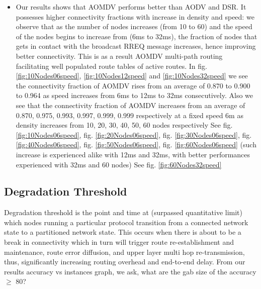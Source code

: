 \documentclass[letterpaper, 10 pt, conference]{ieeeconf}  %
\begin{document}
\begin{itemize}
  \item Our results shows that AOMDV performs better than AODV and DSR. It possesses higher connectivity fractions with increase in density and speed: we observe that as the number of nodes increases (from 10 to 60) and the speed of the nodes begins to increase from (6ms to 32ms), the fraction of nodes that gets in contact with the broadcast RREQ message increases, hence improving better connectivity. This is as a result AOMDV multi-path routing facilitating well populated route tables of active routes. In fig.  \ref{fig:10Nodes06speed}, \ref{fig:10Nodes12speed} and \ref{fig:10Nodes32speed} we see the connectivity fraction of AOMDV rises from an average of 0.870 to 0.900 to 0.964 as speed increases from 6ms to 12ms to 32ms consecutively. Also we see that the connectivity fraction of AOMDV increases from an average of 0.870, 0.975, 0.993, 0.997, 0.999, 0.999 respectively at a fixed speed 6m as density increases from 10, 20, 30, 40, 50, 60 nodes respectively See fig. \ref{fig:10Nodes06speed}, fig. \ref{fig:20Nodes06speed}, fig. \ref{fig:30Nodes06speed}, fig. \ref{fig:40Nodes06speed}, fig. \ref{fig:50Nodes06speed}, fig. \ref{fig:60Nodes06speed}  (such increase is experienced alike with 12ms and 32ms, with better performances experienced with 32ms and 60 nodes) See fig. \ref{fig:60Nodes32speed}
  
 

\end{itemize}


\subsection{Degradation Threshold}
Degradation threshold is the point and time at (surpassed quantitative limit) which nodes running a particular protocol transition from a connected network state to a partitioned network state. This occurs when there is about to be a break in connectivity  which in turn will trigger route re-establishment and maintenance, route error diffusion, and upper layer multi hop re-transmission, thus, significantly increasing routing overhead and end-to-end delay. From our results accuracy vs instances graph, we ask, what are the gab size of the accuracy $\geq$ 80?

\end{document}
